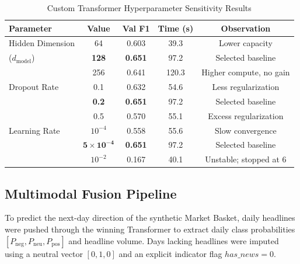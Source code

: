 \documentclass[10pt,journal]{IEEEtran}
\begin{document}
\begin{table}[htbp]
\centering
\caption{Custom Transformer Hyperparameter Sensitivity Results}
\label{tab:hyperparam}
\scriptsize
\setlength{\tabcolsep}{2pt}
\begin{tabular}{lcccc}
\toprule
\textbf{Parameter} & \textbf{Value} & \textbf{Val F1} & \textbf{Time (s)} & \textbf{Observation} \\
\midrule
Hidden Dimension & 64 & 0.603 & 39.3 & Lower capacity \\
($d_{\text{model}}$) & \textbf{128} & \textbf{0.651} & 97.2 & Selected baseline \\
                 & 256 & 0.641 & 120.3 & Higher compute, no gain \\
\midrule
Dropout Rate     & 0.1 & 0.632 & 54.6 & Less regularization \\
                 & \textbf{0.2} & \textbf{0.651} & 97.2 & Selected baseline \\
                 & 0.5 & 0.570 & 55.1 & Excess regularization \\
\midrule
Learning Rate    & $10^{-4}$ & 0.558 & 55.6 & Slow convergence \\
                 & $\mathbf{5\times10^{-4}}$ & \textbf{0.651} & 97.2 & Selected baseline \\
                 & $10^{-2}$ & 0.167 & 40.1 & Unstable; stopped at 6 \\
\bottomrule
\end{tabular}
\end{table}

\subsection{Multimodal Fusion Pipeline}
To predict the next-day direction of the synthetic Market Basket, daily headlines were pushed through the winning Transformer to extract daily class probabilities $[P_{\text{neg}}, P_{\text{neu}}, P_{\text{pos}}]$ and headline volume. Days lacking headlines were imputed using a neutral vector $[0, 1, 0]$ and an explicit indicator flag $has\_news = 0$.
\end{document}
